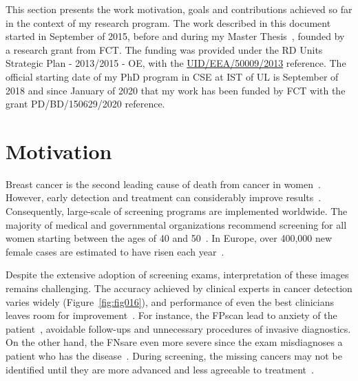 \clearpage
\label{chap:chap001}
\noindent

This section presents the work motivation, goals and contributions achieved so far in the context of my research program.
The work described in this document started in September of 2015, before and during my Master Thesis~\cite{calisto2017mimbcdui}, founded by a research grant from \ac{FCT}.
The funding was provided under the \ac{RD} Units Strategic Plan - 2013/2015 - \ac{OE}, with the \href{https://www.fct.pt/apoios/projectos/consulta/vglobal_projecto.phtml.en?idProjecto=147329&idElemConcurso=8999}{UID/EEA/50009/2013} reference.
The official starting date of my \ac{PhD} program in \ac{CSE} at \ac{IST} of \ac{UL} is September of 2018 and since January of 2020 that my work has been funded by \ac{FCT} with the grant PD/BD/150629/2020 reference.

\section{Motivation}
\label{sec:sec001001}

Breast cancer is the second leading cause of death from cancer in women~\cite{doi:10.3322/caac.21492}.
However, early detection and treatment can considerably improve results~\cite{Seely2018, doi:10.1002/cncr.32859, 10.1093/jnci/djaa080}.
Consequently, large-scale of screening programs are implemented worldwide.
The majority of medical and governmental organizations recommend screening for all women starting between the ages of 40 and 50~\cite{Oeffinger2015, Koczkodaj2019}.
In Europe, over 400,000 new female cases are estimated to have risen each year~\cite{Dafni2019}.

Despite the extensive adoption of screening exams, interpretation of these images remains challenging.
The accuracy achieved by clinical experts in cancer detection varies widely (Figure~\ref{fig:fig016}), and performance of even the best clinicians leaves room for improvement~\cite{KIM2020e138, 10.1001/jamainternmed.2015.5231}.
For instance, the \acp{FP}\footnotemark[1] can lead to anxiety of the patient~\cite{10.1001/jamainternmed.2014.981}, avoidable follow-ups and unnecessary procedures of invasive diagnostics.
On the other hand, the \acp{FN}\footnotemark[2] are even more severe since the exam misdiagnoses a patient who has the disease~\cite{doi:10.1056/NEJMe1912943}.
During screening, the missing cancers may not be identified until they are more advanced and less agreeable to treatment~\cite{Houssami2017}.

